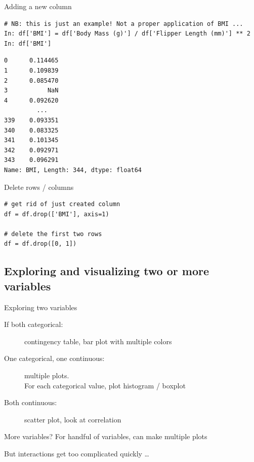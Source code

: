 \documentclass[aspectratio=169,usenames,dvipsnames]{beamer}
\begin{document}
\begin{frame}[fragile]{Adding a new column}
\begin{lstlisting}
# NB: this is just an example! Not a proper application of BMI ...
In: df['BMI'] = df['Body Mass (g)'] / df['Flipper Length (mm)'] ** 2
In: df['BMI']
\end{lstlisting}\vspace{-1em}\begin{lstlisting}[style=plain]
0      0.114465
1      0.109839
2      0.085470
3           NaN
4      0.092620
         ...   
339    0.093351
340    0.083325
341    0.101345
342    0.092971
343    0.096291
Name: BMI, Length: 344, dtype: float64
\end{lstlisting}
\end{frame}

\begin{frame}[fragile]{Delete rows / columns}
\begin{lstlisting}
# get rid of just created column
df = df.drop(['BMI'], axis=1)

# delete the first two rows
df = df.drop([0, 1])
\end{lstlisting}
\end{frame}


\subsection{Exploring and visualizing two or more variables}
\frame{\tableofcontents[currentsubsection]}
\begin{frame}{Exploring two variables}
\begin{description}
    \item[If both categorical:]
            contingency table, bar plot with multiple colors
    \item[One categorical, one continuous:] multiple plots.\\
            For each categorical value, plot histogram / boxplot
    \item[Both continuous:]
         scatter plot, look at correlation
\end{description}

\pause\vspace{1em}
More variables? For handful of variables, can make multiple plots

But interactions get too complicated quickly \dots
\end{frame}
\end{document}
